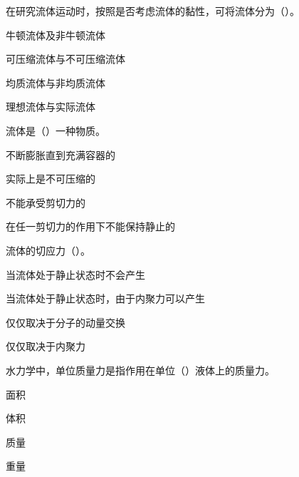 \begin{ti}

\item[1-1] 在研究流体运动时，按照是否考虑流体的黏性，可将流体分为（\quad）。
\begin{choices}
\item 牛顿流体及非牛顿流体
\item 可压缩流体与不可压缩流体
\item 均质流体与非均质流体
\item 理想流体与实际流体
\end{choices}

\item[1-2] 流体是（\quad）一种物质。
\begin{choices}
\item 不断膨胀直到充满容器的
\item 实际上是不可压缩的
\item 不能承受剪切力的
\item 在任一剪切力的作用下不能保持静止的
\end{choices}

\item[1-3] 流体的切应力（\quad）。
\begin{choices}
\item 当流体处于静止状态时不会产生
\item 当流体处于静止状态时，由于内聚力可以产生
\item 仅仅取决于分子的动量交换
\item 仅仅取决于内聚力
\end{choices}

\item[1-4] 水力学中，单位质量力是指作用在单位（\quad）液体上的质量力。
\begin{choices}
\item 面积
\item 体积
\item 质量
\item 重量
\end{choices}


\end{ti}

